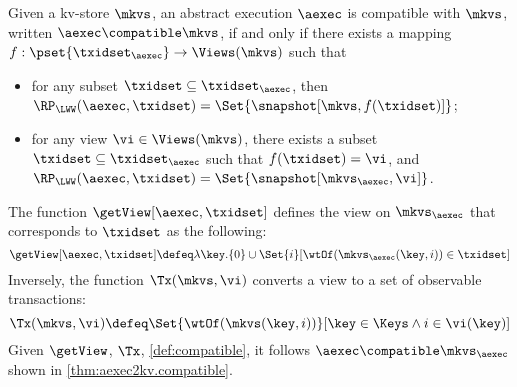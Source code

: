 \begin{definition}
\label{def:compatible}
Given a kv-store $\mkvs$,
an abstract execution $\aexec$ is compatible with $\mkvs$, written 
$\aexec \compatible \mkvs$, if and only if there exists a  mapping 
$f: \pset{\txidset_{\aexec}} \rightarrow \Views(\mkvs)$
such that  
\begin{itemize}
\item for any subset $\txidset \subseteq \txidset_{\aexec}$, then $\RP_{\LWW}(\aexec, \txidset) = \Set{\snapshot[\mkvs, f(\txidset)]}$; 
\item for any view $\vi \in \Views(\mkvs)$, there exists a subset $\txidset \subseteq \txidset_{\aexec}$ 
such that $f(\txidset) = \vi$, and $\RP_{\LWW}(\aexec, \txidset) = \Set{\snapshot[\mkvs_{\aexec}, \vi]}$.
\end{itemize}
\end{definition}

The function $\getView[\aexec, \txidset]$ defines the view on \( \mkvs_\aexec \) that corresponds to \( \txidset \) as the following:
\[
    \getView[\aexec, \txidset] \defeq \lambda \key. \{0\} \cup \Set{i}[\wtOf(\mkvs_{\aexec}(\key, i)) \in \txidset]
\]
Inversely, the function \( \Tx(\mkvs, \vi) \) converts a view to a set of observable transactions:
\[
    \Tx(\mkvs, \vi) \defeq \Set{\wtOf(\mkvs(\key, i))}[\key \in \Keys \land i \in \vi(\key)]
\]
Given \( \getView \), \( \Tx \), \cref{def:compatible}, 
it follows \( \aexec \compatible \mkvs_{\aexec} \) shown in \cref{thm:aexec2kv.compatible}.

